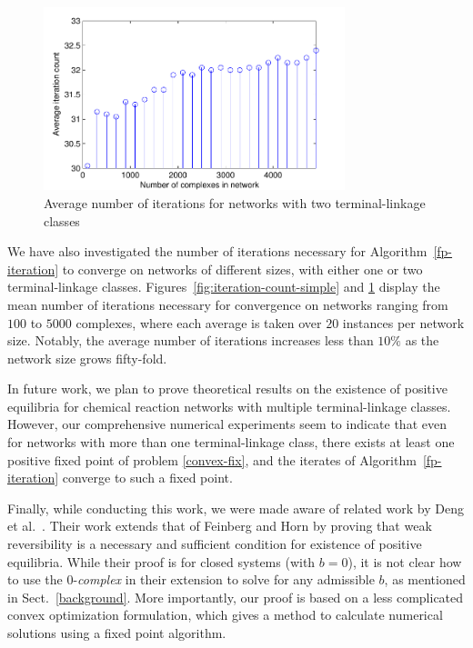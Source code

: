\documentclass[smallextended]{svjour3}       %
\newcommand*{\0}{\mathbf{0}}
\newcommand*{\1}{\mathbf{1}}
\begin{document}
\begin{figure}%
   \centering
   \includegraphics[width=0.78\textwidth]{MultipleNetAvgIterationsVsNetSize} 
   \caption{Average number of iterations for networks with two terminal-linkage
            classes}
   \label{fig:iteration-count-multiple} 
\end{figure}


We have also investigated the number of iterations necessary for
Algorithm~\ref{fp-iteration} to converge on networks of different
sizes, with either one or two terminal-linkage classes.
Figures~\ref{fig:iteration-count-simple} and
\ref{fig:iteration-count-multiple} display the mean number of
iterations necessary for convergence on networks ranging from $100$ to
$5000$ complexes, where each average is taken over $20$ instances per
network size. Notably, the average number of iterations increases less
than $10\%$ as the network size grows fifty-fold.

In future work, we plan to prove theoretical results on the existence of
positive equilibria for chemical reaction networks with multiple
terminal-linkage classes.  However, our comprehensive numerical experiments
seem to indicate that even for networks with more than one terminal-linkage
class, there exists at least one positive fixed point of problem
\eqref{convex-fix}, and the iterates of Algorithm~\ref{fp-iteration} converge
to such a fixed point.

Finally, while conducting this work, we were made aware of related work by Deng
et al.\ \cite{Deng}. Their work extends that of Feinberg and Horn by proving
that weak reversibility is a necessary and sufficient condition for existence
of positive equilibria. While their proof is for closed systems (with $b=0$),
it is not clear how to use the $0$-\emph{complex} in their extension to
solve for any admissible $b$, as mentioned in Sect.~\ref{background}.  More
importantly, our proof is based on a less complicated convex optimization
formulation, which gives a method to calculate numerical solutions using a
fixed point algorithm.
\end{document}
